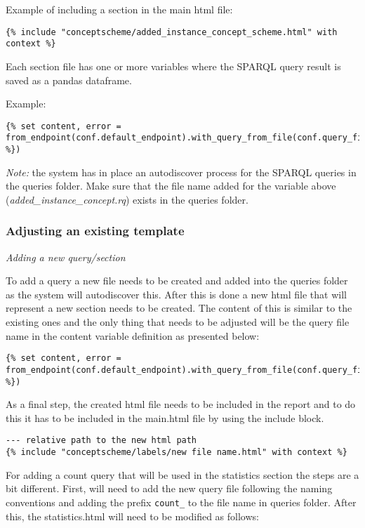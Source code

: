 Example of including a section in the main html file:
\begin{lstlisting}
{% include "conceptscheme/added_instance_concept_scheme.html" with context %}
\end{lstlisting}

Each section file has one or more variables where the SPARQL query result is saved as a pandas dataframe.

Example:
\begin{lstlisting}
{% set content, error = from_endpoint(conf.default_endpoint).with_query_from_file(conf.query_files["added_instance_concept.rq"]).fetch_tabular() %})
\end{lstlisting}

\textit{Note:} the system has in place an autodiscover process for the SPARQL queries in the queries folder. Make sure that the file name added for the variable above (\textit{added\_instance\_concept.rq}) exists in the queries folder.

\subsubsection{Adjusting an existing template}
\textit{Adding a new query/section}

To add a query a new file needs to be created and added into the queries folder as the system will autodiscover this. After this is done a new html file that will represent a new section needs to be created. The content of this is similar to the existing ones and the only thing that needs to be adjusted will be the query file name in the content variable definition as presented below:

\begin{lstlisting}
{% set content, error = from_endpoint(conf.default_endpoint).with_query_from_file(conf.query_files["new_query_file.rq"]).fetch_tabular() %})
\end{lstlisting}

As a final step, the created html file needs to be included in the report and to do this it has to be included in the main.html file by using the include block.

\begin{lstlisting}
--- relative path to the new html path
{% include "conceptscheme/labels/new file name.html" with context %}
\end{lstlisting}

For adding a count query that will be used in the statistics section the steps are a bit different. First, will need to add the new query file following the naming conventions and adding the prefix \texttt{count\_} to the file name in queries folder. After this, the statistics.html will need to be modified as follows:

